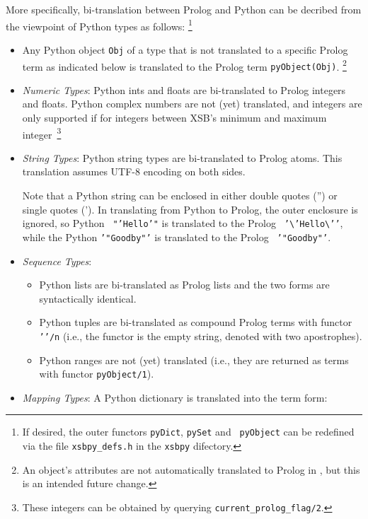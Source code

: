 \begin{description}
More specifically, bi-translation between Prolog and Python can be
decribed from the viewpoint of Python types as follows: \footnote{If
  desired, the outer functors {\tt pyDict}, {\tt pySet} and {\tt
    pyObject} can be redefined via the file {\tt xsbpy\_defs.h} in the
  {\tt xsbpy} difectory.}

\begin{itemize}
     \item Any Python object {\tt Obj} of a type that is not
       translated to a specific Prolog term as indicated below is
       translated to the Prolog term {\tt pyObject(Obj)}. \footnote{An
         object's attributes are not automatically translated to
         Prolog in \xsbpyversion{}, but this is an intended future
         change.}
       \item {\em Numeric Types}: Python ints and floats are
         bi-translated to Prolog integers and floats.  Python complex
         numbers are not (yet) translated, and integers are only
         supported if for integers between XSB's minimum and maximum
         integer~\footnote{These integers can be obtained by querying
           {\tt current\_prolog\_flag/2}.}
       \item {\em String Types}: Python string types are bi-translated
         to Prolog atoms.  This translation assumes UTF-8 encoding on
         both sides.

         Note that a Python string can be enclosed in either double
         quotes ('') or single quotes (').  In translating from Python
         to Prolog, the outer enclosure is ignored, so Python {\tt
           "'Hello'"} is translated to the Prolog {\tt
           '\textbackslash{}'Hello\textbackslash{}'{}'}, while the
         Python {\tt '"Goodby"'} is translated to the Prolog {\tt
           '"Goodby"'}.
       \item {\em Sequence Types}:
         \begin{itemize}
           \item Python lists are bi-translated as Prolog lists and
             the two forms are syntactically identical.
           \item Python tuples are bi-translated as compound Prolog
             terms with functor {\tt '{}'/n} (i.e., the functor is the
             empty string, denoted with two apostrophes).
             \item Python ranges are not (yet) translated (i.e., they
               are returned as terms with functor {\tt pyObject/1}).
         \end{itemize}
       \item {\em Mapping Types}: A Python dictionary is translated
         into the term form:


\end{itemize}
\end{description}

